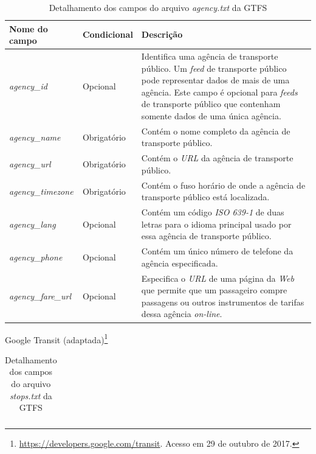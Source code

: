 \documentclass[
	12pt,				%
	oneside,			%
	a4paper,			%
	english,			%
	brazil				%
	]{abntex2ppgsi}
\begin{document}
{{{\begin{apendicesenv}
\begin{table}[!htb]
\centering
  \caption{Detalhamento dos campos do arquivo \textit{agency.txt} da GTFS}
      \label{tab:gtfsAgency}
\begin{tabular}{>{\centering\arraybackslash}m{3.5cm} | >{\centering}m{3cm} | >{\centering\arraybackslash}m{8cm}}
\hline
\textbf{Nome do campo} & \textbf{Condicional} & \textbf{Descrição} \\
\hline
\textit{agency\_id} & Opcional & Identifica uma agência de transporte público. Um \textit{feed} de transporte público pode representar dados de mais de uma agência. Este campo é opcional para \textit{feeds} de transporte público que contenham somente dados de uma única agência. \\
\hline
\textit{agency\_name} & Obrigatório & Contém o nome completo da agência de transporte público. \\
\hline
\textit{agency\_url} & Obrigatório & Contém o \textit{URL} da agência de transporte público. \\
\hline
\textit{agency\_timezone} & Obrigatório & Contém o fuso horário de onde a agência de transporte público está localizada. \\
\hline
\textit{agency\_lang} & Opcional & Contém um código \textit{ISO 639-1} de duas letras para o idioma principal usado por essa agência de transporte público. \\
\hline
\textit{agency\_phone} & Opcional & Contém um único número de telefone da agência especificada. \\
\hline
\textit{agency\_fare\_url} & Opcional & Especifica o \textit{URL} de uma página da \textit{Web} que permite que um passageiro compre passagens ou outros instrumentos de tarifas dessa agência \textit{on-line}. \\
\hline
\end{tabular}
\end{table}
\vspace{-\baselineskip}
 Google Transit (adaptada)\footnote{\label{gtfsFields}\url{https://developers.google.com/transit}. Acesso em 29 de outubro de 2017.}

\clearpage

\begin{longtable}[!htb]{>{\centering\arraybackslash}m{3.8cm} | >{\centering}m{2.5cm} | >{\centering\arraybackslash}m{8.5cm}}
  \caption{Detalhamento dos campos do arquivo \textit{stops.txt} da GTFS}
      \label{tab:gtfsStops} \\


\end{longtable}
\end{apendicesenv}}}}
\end{document}
